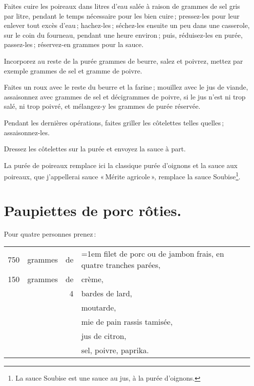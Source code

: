 Faites cuire les poireaux dans {\mmm} litres d'eau salée à raison de {\mmm} grammes de
sel gris par litre, pendant le temps nécessaire pour les bien cuire ;
pressez-les pour leur enlever tout excès d’eau ; hachez-les ; séchez-les
ensuite un peu dans une casserole, sur le coin du fourneau, pendant une heure
environ ; puis, réduisez-les en purée, passez-les ; réservez-en {\mmm} grammes pour
la sauce.

Incorporez au reste de la purée {\mmm} grammes de beurre, salez et poivrez, mettez
par exemple {\mmm} grammes de sel et {\mmm} gramme de poivre.

Faites un roux avec le reste du beurre et la farine ; mouillez avec le jus de
viande, assaisonnez avec {\mmm} grammes de sel et {\mmm} décigrammes de poivre, si le jus
n'est ni trop salé, ni trop poivré, et mélangez-y les {\mmm} grammes de purée
réservée.

Pendant les dernières opérations, faites griller les côtelettes telles
quelles ; assaisonnez-les.

Dressez les côtelettes sur la purée et envoyez la sauce à part.

La purée de poireaux remplace ici la classique purée d'oignons et la sauce aux
poireaux, que j'appellerai sauce « Mérite agricole », remplace la sauce
Soubise\footnote{La sauce Soubise est une sauce au jus, à la purée d'oignons.}.

\section*{\centering Paupiettes de porc rôties.}
{}

Pour quatre personnes prenez :

\medskip

\footnotesize
\begin{longtable}{rrrp{16em}}
    750 & grammes & de & \hangindent=1em filet de porc ou de jambon frais, en quatre tranches parées,     \\
    150 & grammes & de & crème,                                                                           \\
        &         &  4 & bardes de lard,                                                                  \\
        &         &    & moutarde,                                                                        \\
        &         &    & mie de pain rassis tamisée,                                                      \\
        &         &    & jus de citron,                                                                   \\
        &         &    & sel, poivre, paprika.                                                            \\
\end{longtable}
\normalsize

